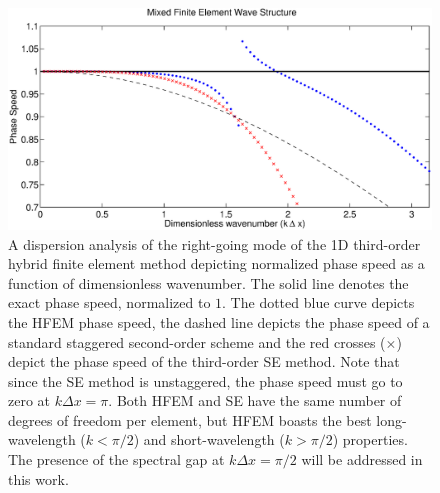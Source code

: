 \documentclass[11pt]{article}
\begin{document}
\begin{figure}
\begin{center}
\includegraphics[width=5in]{HFEM_ThirdOrder}
\end{center}
\caption{A dispersion analysis of the right-going mode of the 1D third-order hybrid finite element method depicting normalized phase speed as a function of dimensionless wavenumber.  The solid line denotes the exact phase speed, normalized to $1$.  The dotted blue curve depicts the HFEM phase speed, the dashed line depicts the phase speed of a standard staggered second-order scheme and the red crosses ($\times$) depict the phase speed of the third-order SE method.  Note that since the SE method is unstaggered, the phase speed must go to zero at $k \Delta x = \pi$.  Both HFEM and SE have the same number of degrees of freedom per element, but HFEM boasts the best long-wavelength ($k < \pi/2$) and short-wavelength ($k > \pi/2$) properties.  The presence of the spectral gap at $k \Delta x = \pi / 2$ will be addressed in this work.} \label{fig:HFEMEigenstructure}
\end{figure}
\end{document}
